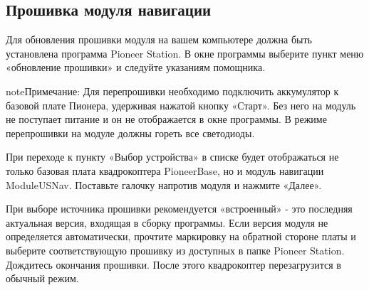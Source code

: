 \documentclass[a4paper,10pt,russian]{sphinxmanual}
\begin{document}
\subsection{Прошивка модуля навигации}
\label{\detokenize{module/indoor_nav:id4}}
Для обновления прошивки модуля на вашем компьютере должна быть установлена программа Pioneer Station. В окне программы выберите пункт меню «обновление прошивки» и следуйте указаниям помощника.

\begin{sphinxadmonition}{note}{Примечание:}
Для перепрошивки необходимо подключить аккумулятор к базовой плате Пионера, удерживая нажатой кнопку «Старт». Без него на модуль не поступает питание и он не отображается в окне программы. В режиме перепрошивки на модуле должны гореть все светодиоды.
\end{sphinxadmonition}

При переходе к пункту «Выбор устройства» в списке будет отображаться не только базовая плата квадрокоптера PioneerBase, но и модуль навигации ModuleUSNav. Поставьте галочку напротив модуля и нажмите «Далее».


При выборе источника прошивки рекомендуется «встроенный» - это последняя актуальная версия, входящая в сборку программы.
Если версия модуля не определяется автоматически, прочтите маркировку на обратной стороне платы и выберите соответствующую прошивку из доступных в папке Pioneer Station.
Дождитесь окончания прошивки. После этого квадрокоптер перезагрузится в обычный режим.
\end{document}

